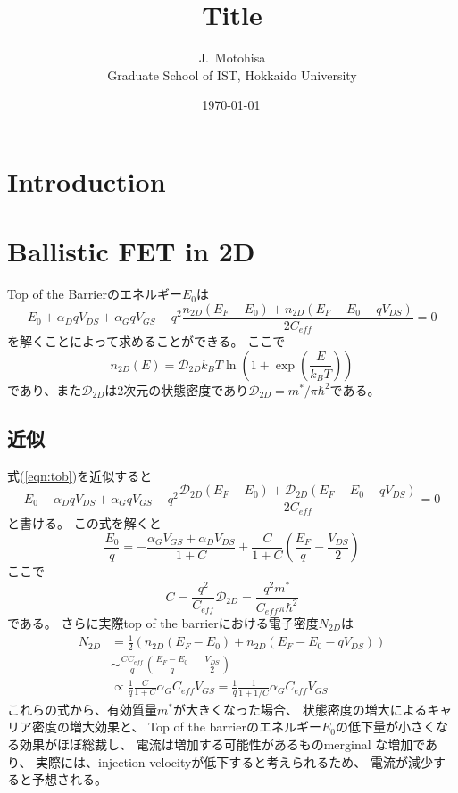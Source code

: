 \documentclass[11pt,uplatex,a4paper]{jsarticle}
\begin{document}
\title{Title}
\author{J.~Motohisa\\Graduate School of IST, Hokkaido University}
\date{\shortdate\today \, \ampmtime }
\maketitle

\section{Introduction}

\section{Ballistic FET in 2D}
Top of the Barrierのエネルギー$E_0$は
\begin{equation}
 E_0 + \alpha_D q V_{DS} + \alpha_G q V_{GS} -
  q^2\frac{n_{2D}(E_F - E_0)+n_{2D}(E_F-E_0-qV_{DS})}{2 C_{eff}}=0
  \label{eqn:tob}
\end{equation}
を解くことによって求めることができる。
ここで
\begin{equation}
 n_{2D}(E) = \mathcal{D}_{2D}k_B T \ln (1+\exp(\frac{E}{k_B T}))
\end{equation}
であり、また$\mathcal{D}_{2D}$は2次元の状態密度であり$\mathcal{D}_{2D}=m^*/\pi \hbar^2$である。

  \subsection{近似}
式(\ref{eqn:tob})を近似すると
\begin{equation}
 E_0 + \alpha_D q V_{DS} + \alpha_G q V_{GS} -
  q^2\frac{\mathcal{D}_{2D}(E_F - E_0)+\mathcal{D}_{2D}(E_F-E_0-qV_{DS})}{2 C_{eff}}=0
\end{equation}
と書ける。
 この式を解くと
 \begin{equation}
  \frac{E_0}{q} = -\frac{\alpha_G V_{GS} + \alpha_D V_{DS}}{1+C}
   + \frac{C}{1+C} (\frac{E_{F}}{q}-\frac{V_{DS}}{2})
 \end{equation}
 ここで
\begin{equation}
 C=\frac{q^2}{C_{eff}}\mathcal{D}_{2D} = \frac{q^2m^*}{C_{eff}\pi \hbar^2}
\end{equation}
である。
さらに実際top of the barrierにおける電子密度$N_{2D}$は
\begin{equation}
 \begin{split}
 N_{2D} &= \frac{1}{2}
  (n_{2D}(E_F-E_0) + n_{2D}(E_F-E_0-qV_{DS})) \\
  &\sim \frac{C C_{eff}}{q} (\frac{E_F - E_0}{q} - \frac{V_{DS}}{2}) \\
  &\propto \frac{1}{q}\frac{C}{1+C} \alpha_G C_{eff} V_{GS}
  = \frac{1}{q}\frac{1}{1+1/C} \alpha_G C_{eff} V_{GS}
 \end{split}
\end{equation}
これらの式から、有効質量$m^*$が大きくなった場合、
状態密度の増大によるキャリア密度の増大効果と、
Top of the barrierのエネルギー$E_0$の低下量が小さくなる効果がほぼ総裁し、
電流は増加する可能性があるものmerginal な増加であり、
実際には、injection velocityが低下すると考えられるため、
電流が減少すると予想される。
\end{document}
